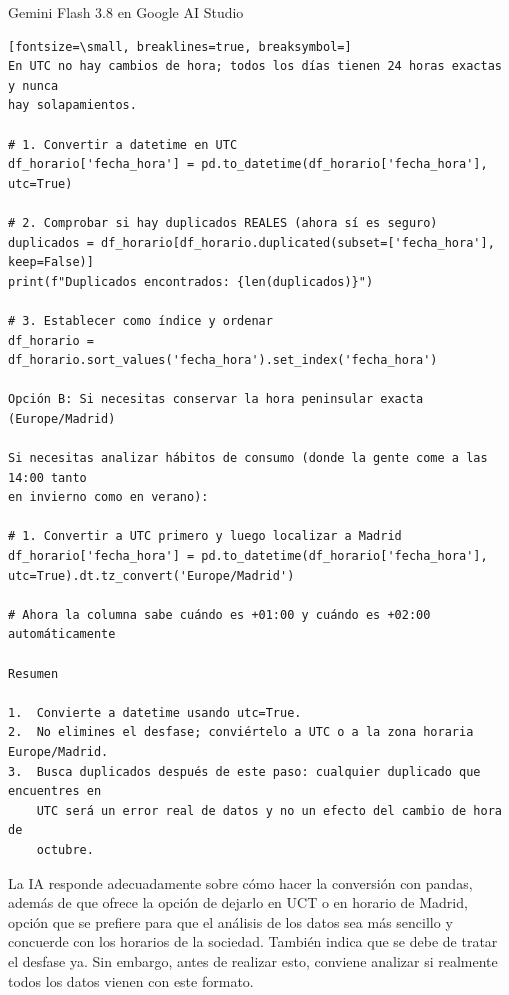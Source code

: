 \documentclass[12pt,a4paper,oneside]{book}
\begin{document}
\begin{iaresp}{Gemini Flash 3.8 en Google AI Studio}
\begin{Verbatim}[fontsize=\small, breaklines=true, breaksymbol=]
En UTC no hay cambios de hora; todos los días tienen 24 horas exactas y nunca
hay solapamientos.

# 1. Convertir a datetime en UTC
df_horario['fecha_hora'] = pd.to_datetime(df_horario['fecha_hora'], utc=True)

# 2. Comprobar si hay duplicados REALES (ahora sí es seguro)
duplicados = df_horario[df_horario.duplicated(subset=['fecha_hora'], keep=False)]
print(f"Duplicados encontrados: {len(duplicados)}")

# 3. Establecer como índice y ordenar
df_horario = df_horario.sort_values('fecha_hora').set_index('fecha_hora')

Opción B: Si necesitas conservar la hora peninsular exacta (Europe/Madrid)

Si necesitas analizar hábitos de consumo (donde la gente come a las 14:00 tanto
en invierno como en verano):

# 1. Convertir a UTC primero y luego localizar a Madrid
df_horario['fecha_hora'] = pd.to_datetime(df_horario['fecha_hora'], utc=True).dt.tz_convert('Europe/Madrid')

# Ahora la columna sabe cuándo es +01:00 y cuándo es +02:00 automáticamente

Resumen

1.  Convierte a datetime usando utc=True.
2.  No elimines el desfase; conviértelo a UTC o a la zona horaria Europe/Madrid.
3.  Busca duplicados después de este paso: cualquier duplicado que encuentres en
    UTC será un error real de datos y no un efecto del cambio de hora de
    octubre.

\end{Verbatim}
\end{iaresp}
\begin{iaanalisis}
La IA responde adecuadamente sobre cómo hacer la conversión con pandas, además de que ofrece la opción de dejarlo en UCT o en horario de Madrid, opción que se prefiere para que el análisis de los datos sea más sencillo y concuerde con los horarios de la sociedad. También indica que se debe de tratar el desfase ya. Sin embargo, antes de realizar esto, conviene analizar si realmente todos los datos vienen con este formato.
\end{iaanalisis}
\end{document}
